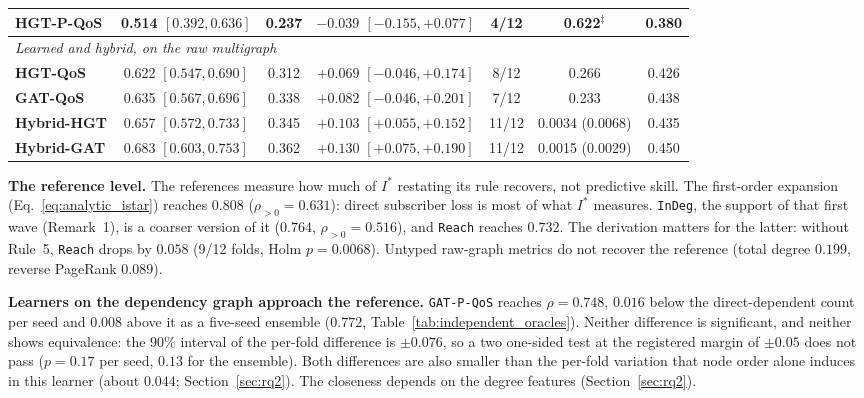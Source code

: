 \begin{table}[htbp]
{\begin{tabular}{lcccccc}
\textbf{HGT-P-QoS} & 0.514 $[0.392, 0.636]$ & 0.237 & $-0.039$ $[-0.155, +0.077]$ & 4/12 & 0.622$^\ddagger$ & 0.380 \\
\midrule
\multicolumn{7}{l}{\textit{Learned and hybrid, on the raw multigraph}} \\
\textbf{HGT-QoS} & 0.622 $[0.547, 0.690]$ & 0.312 & $+0.069$ $[-0.046, +0.174]$ & 8/12 & 0.266 & 0.426 \\
\textbf{GAT-QoS} & 0.635 $[0.567, 0.696]$ & 0.338 & $+0.082$ $[-0.046, +0.201]$ & 7/12 & 0.233 & 0.438 \\
\textbf{Hybrid-HGT} & 0.657 $[0.572, 0.733]$ & 0.345 & $+0.103$ $[+0.055, +0.152]$ & 11/12 & 0.0034 (0.0068) & 0.435 \\
\textbf{Hybrid-GAT} & 0.683 $[0.603, 0.753]$ & 0.362 & $+0.130$ $[+0.075, +0.190]$ & 11/12 & 0.0015 (0.0029) & 0.450 \\
\bottomrule
\end{tabular}%
}
\end{table}

\noindent\textbf{The reference level.} The references measure how much of $I^*$ restating its rule recovers, not predictive skill. The first-order expansion (Eq.~\eqref{eq:analytic_istar}) reaches $0.808$ ($\rho_{>0} = 0.631$): direct subscriber loss is most of what $I^*$ measures. \texttt{InDeg}, the support of that first wave (Remark~1), is a coarser version of it ($0.764$, $\rho_{>0} = 0.516$), and \texttt{Reach} reaches $0.732$. The derivation matters for the latter: without Rule~5, \texttt{Reach} drops by $0.058$ (9/12 folds, Holm $p = 0.0068$). Untyped raw-graph metrics do not recover the reference (total degree $0.199$, reverse PageRank $0.089$).

\noindent\textbf{Learners on the dependency graph approach the reference.} \texttt{GAT-P-QoS} reaches $\rho = 0.748$, $0.016$ below the direct-dependent count per seed and $0.008$ above it as a five-seed ensemble ($0.772$, Table~\ref{tab:independent_oracles}). Neither difference is significant, and neither shows equivalence: the $90\%$ interval of the per-fold difference is $\pm 0.076$, so a two one-sided test at the registered margin of $\pm 0.05$ does not pass ($p = 0.17$ per seed, $0.13$ for the ensemble). Both differences are also smaller than the per-fold variation that node order alone induces in this learner (about $0.044$; Section~\ref{sec:rq2}). The closeness depends on the degree features (Section~\ref{sec:rq2}).

